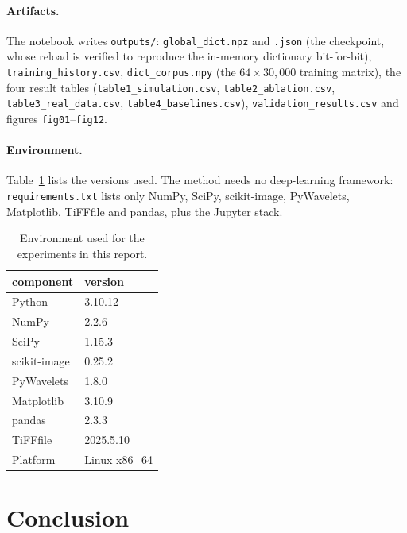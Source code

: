 \documentclass[11pt,a4paper]{article}
\begin{document}
\paragraph{Artifacts.}
{\raggedright
The notebook writes \texttt{outputs/}: \texttt{global\_dict.npz} and \texttt{.json} (the checkpoint, whose reload is
verified to reproduce the in-memory dictionary bit-for-bit), \texttt{training\_history.csv},
\texttt{dict\_corpus.npy} (the $64\times30{,}000$ training matrix), the four result tables
(\texttt{table1\_simulation.csv}, \texttt{table2\_ablation.csv}, \texttt{table3\_real\_data.csv},
\texttt{table4\_baselines.csv}), \texttt{validation\_results.csv} and figures \texttt{fig01}--\texttt{fig12}.\par}

\paragraph{Environment.}
Table~\ref{tab:env} lists the versions used. The method needs no deep-learning framework: \texttt{requirements.txt}
lists only NumPy, SciPy, scikit-image, PyWavelets, Matplotlib, TiFFfile and pandas, plus the Jupyter stack.

\begin{table}[H]
\centering
\caption{Environment used for the experiments in this report.}
\label{tab:env}
\footnotesize
\begin{tabular}{@{}l l@{}}
\toprule
component & version\\
\midrule
Python & 3.10.12 \\
NumPy & 2.2.6 \\
SciPy & 1.15.3 \\
scikit-image & 0.25.2 \\
PyWavelets & 1.8.0 \\
Matplotlib & 3.10.9 \\
pandas & 2.3.3 \\
TiFFfile & 2025.5.10 \\
Platform & Linux x86\_64 \\
\bottomrule
\end{tabular}
\end{table}

\section{Conclusion}
\end{document}
